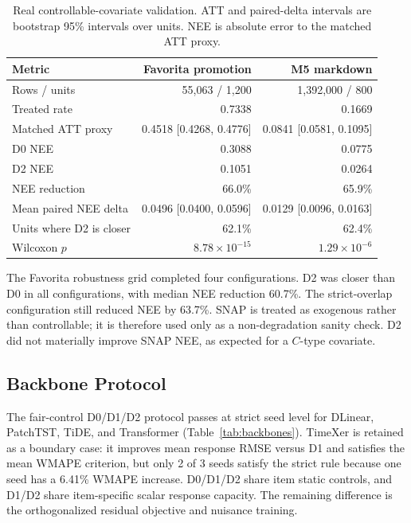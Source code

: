 \documentclass[11pt]{article}
\begin{document}
\begin{table}[t]
\centering
\caption{Real controllable-covariate validation. ATT and paired-delta intervals
are bootstrap 95\% intervals over units. NEE is absolute error to the matched
ATT proxy.}
\label{tab:real}
\begin{tabular}{lrr}
\toprule
Metric & Favorita promotion & M5 markdown \\
\midrule
Rows / units & 55,063 / 1,200 & 1,392,000 / 800 \\
Treated rate & 0.7338 & 0.1669 \\
Matched ATT proxy & 0.4518 [0.4268, 0.4776] & 0.0841 [0.0581, 0.1095] \\
D0 NEE & 0.3088 & 0.0775 \\
D2 NEE & 0.1051 & 0.0264 \\
NEE reduction & 66.0\% & 65.9\% \\
Mean paired NEE delta & 0.0496 [0.0400, 0.0596] & 0.0129 [0.0096, 0.0163] \\
Units where D2 is closer & 62.1\% & 62.4\% \\
Wilcoxon $p$ & $8.78\times10^{-15}$ & $1.29\times10^{-6}$ \\
\bottomrule
\end{tabular}
\end{table}

The Favorita robustness grid completed four configurations. D2 was closer than
D0 in all configurations, with median NEE reduction 60.7\%. The strict-overlap
configuration still reduced NEE by 63.7\%. SNAP is treated as exogenous rather
than controllable; it is therefore used only as a non-degradation sanity check.
D2 did not materially improve SNAP NEE, as expected for a $C$-type covariate.

\subsection{Backbone Protocol}

The fair-control D0/D1/D2 protocol passes at strict seed level for DLinear,
PatchTST, TiDE, and Transformer (Table~\ref{tab:backbones}). TimeXer is retained as a
boundary case: it improves mean response RMSE versus D1 and satisfies the mean
WMAPE criterion, but only 2 of 3 seeds satisfy the strict rule because one seed
has a 6.41\% WMAPE increase. D0/D1/D2 share item static controls, and D1/D2
share item-specific scalar response capacity. The remaining difference is the
orthogonalized residual objective and nuisance training.
\end{document}
